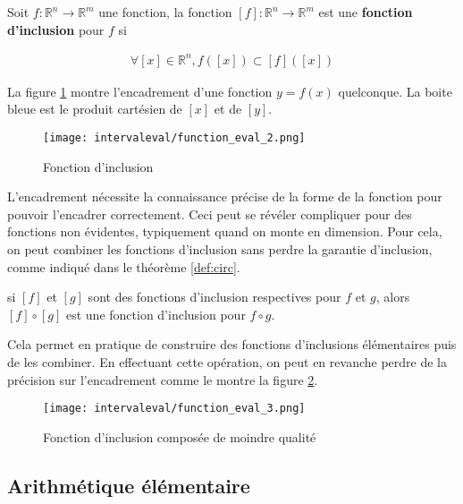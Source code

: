 \begin{definition}
    Soit $f : \mathbb{R}^n \rightarrow \mathbb{R}^m$ une fonction, la fonction $[f] : \mathbb{R}^n \rightarrow \mathbb{R}^m$ est une \textbf{fonction d'inclusion} pour $f$ si

    \begin{align}
        \forall[x] \in \mathbb{R}^n , f([x]) \subset [f]([x])
    \end{align}
\end{definition}

\begin{ex}
  La figure \ref{fig:fct2} montre l'encadrement d'une fonction $y = f(x)$ quelconque. La boite bleue est le produit cartésien de $[x]$ et de $[y]$.

  \begin{figure}[H]
    \centering
    \texttt{[image: intervaleval/function\_eval\_2.png]}
    \caption{Fonction d'inclusion}
    \label{fig:fct2}
  \end{figure}
\end{ex}

L'encadrement nécessite la connaissance précise de la forme de la fonction pour pouvoir l'encadrer correctement. Ceci peut se révéler compliquer pour des fonctions non évidentes, typiquement quand on monte en dimension. Pour cela, on peut combiner les fonctions d'inclusion sans perdre la garantie d'inclusion, comme indiqué dans le théorème \ref{def:circ}.

\begin{theoreme}
  \label{def:circ}
  si $[f]$ et $[g]$ sont des fonctions d'inclusion respectives pour $f$ et $g$, alors $[f] \circ [g]$ est une fonction d'inclusion pour $f \circ g$.
\end{theoreme}

Cela permet en pratique de construire des fonctions d'inclusions élémentaires puis de les combiner. En effectuant cette opération, on peut en revanche perdre de la précision sur l'encadrement comme le montre la figure \ref{fig:fct3}.

\begin{figure}[H]
  \centering
  \texttt{[image: intervaleval/function\_eval\_3.png]}
  \caption{Fonction d'inclusion composée de moindre qualité}
  \label{fig:fct3}
\end{figure}


\subsection{Arithmétique élémentaire}

